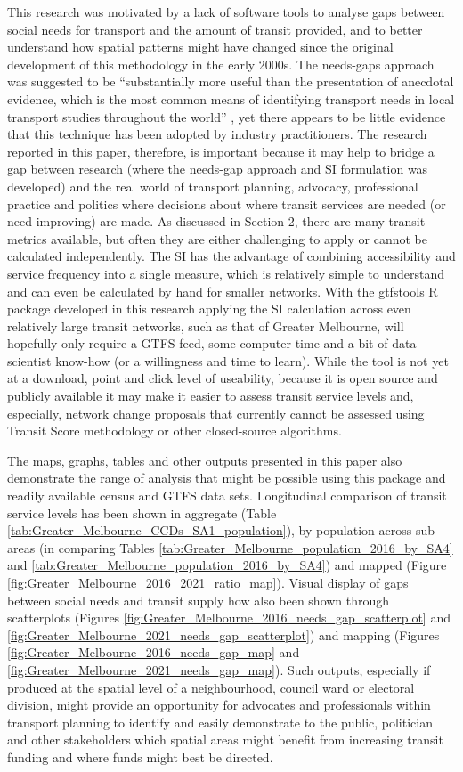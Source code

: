 \documentclass[preprint, 3p,
authoryear]{elsarticle} %
\begin{document}
This research was motivated by a lack of software tools to analyse gaps
between social needs for transport and the amount of transit provided,
and to better understand how spatial patterns might have changed since
the original development of this methodology in the early 2000s. The
needs-gaps approach was suggested to be ``substantially more useful than
the presentation of anecdotal evidence, which is the most common means
of identifying transport needs in local transport studies throughout the
world'' \citep{currie2010identifying}, yet there appears to be little
evidence that this technique has been adopted by industry practitioners.
The research reported in this paper, therefore, is important because it
may help to bridge a gap between research (where the needs-gap approach
and SI formulation was developed) and the real world of transport
planning, advocacy, professional practice and politics where decisions
about where transit services are needed (or need improving) are made. As
discussed in Section 2, there are many transit metrics available, but
often they are either challenging to apply or cannot be calculated
independently. The SI has the advantage of combining accessibility and
service frequency into a single measure, which is relatively simple to
understand and can even be calculated by hand for smaller networks. With
the gtfstools R package developed in this research applying the SI
calculation across even relatively large transit networks, such as that
of Greater Melbourne, will hopefully only require a GTFS feed, some
computer time and a bit of data scientist know-how (or a willingness and
time to learn). While the tool is not yet at a download, point and click
level of useability, because it is open source and publicly available it
may make it easier to assess transit service levels and, especially,
network change proposals that currently cannot be assessed using Transit
Score methodology or other closed-source algorithms.

The maps, graphs, tables and other outputs presented in this paper also
demonstrate the range of analysis that might be possible using this
package and readily available census and GTFS data sets. Longitudinal
comparison of transit service levels has been shown in aggregate (Table
\ref{tab:Greater_Melbourne_CCDs_SA1_population}), by population across
sub-areas (in comparing Tables
\ref{tab:Greater_Melbourne_population_2016_by_SA4} and
\ref{tab:Greater_Melbourne_population_2016_by_SA4}) and mapped (Figure
\ref{fig:Greater_Melbourne_2016_2021_ratio_map}). Visual display of gaps
between social needs and transit supply how also been shown through
scatterplots (Figures
\ref{fig:Greater_Melbourne_2016_needs_gap_scatterplot} and
\ref{fig:Greater_Melbourne_2021_needs_gap_scatterplot}) and mapping
(Figures \ref{fig:Greater_Melbourne_2016_needs_gap_map} and
\ref{fig:Greater_Melbourne_2021_needs_gap_map}). Such outputs,
especially if produced at the spatial level of a neighbourhood, council
ward or electoral division, might provide an opportunity for advocates
and professionals within transport planning to identify and easily
demonstrate to the public, politician and other stakeholders which
spatial areas might benefit from increasing transit funding and where
funds might best be directed.
\end{document}
